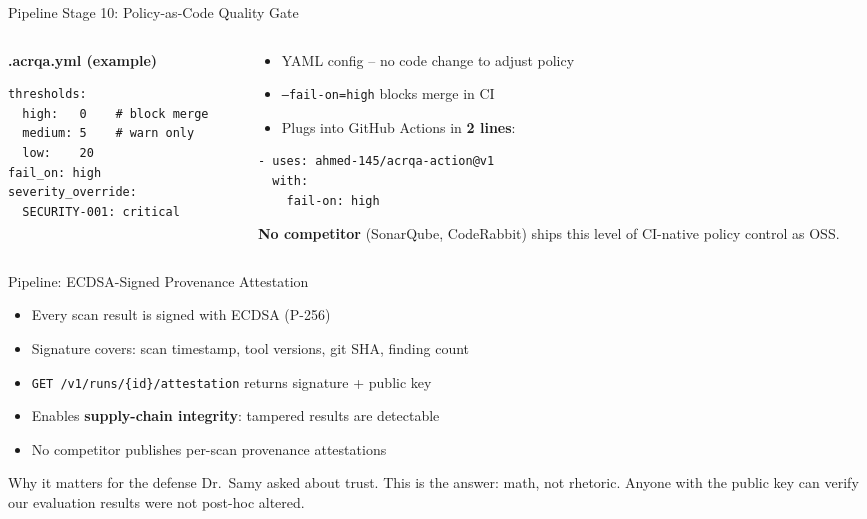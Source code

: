 \documentclass[aspectratio=169,12pt]{beamer}
\begin{document}
\begin{frame}[fragile]{Pipeline Stage 10: Policy-as-Code Quality Gate}
  \begin{columns}[T]
    \begin{column}{0.5\textwidth}
      \textbf{.acrqa.yml (example)}
      \vspace{4pt}
      \begin{lstlisting}
thresholds:
  high:   0    # block merge
  medium: 5    # warn only
  low:    20
fail_on: high
severity_override:
  SECURITY-001: critical
      \end{lstlisting}
    \end{column}
    \begin{column}{0.5\textwidth}
      \begin{itemize}
        \item YAML config -- no code change to adjust policy
        \item \texttt{--fail-on=high} blocks merge in CI
        \item Plugs into GitHub Actions in \textbf{2 lines}:
      \end{itemize}
      \begin{lstlisting}
- uses: ahmed-145/acrqa-action@v1
  with:
    fail-on: high
      \end{lstlisting}
      \vspace{4pt}
      \textbf{No competitor} (SonarQube, CodeRabbit) ships this level of CI-native policy control as OSS.
    \end{column}
  \end{columns}
\end{frame}

\begin{frame}{Pipeline: ECDSA-Signed Provenance Attestation}
  \begin{itemize}
    \item Every scan result is signed with ECDSA (P-256)
    \item Signature covers: scan timestamp, tool versions, git SHA, finding count
    \item \texttt{GET /v1/runs/\{id\}/attestation} returns signature + public key
    \item Enables \textbf{supply-chain integrity}: tampered results are detectable
    \item No competitor publishes per-scan provenance attestations
  \end{itemize}
  \vspace{8pt}
  \begin{exampleblock}{Why it matters for the defense}
    Dr.\ Samy asked about trust. This is the answer: math, not rhetoric.
    Anyone with the public key can verify our evaluation results were not
    post-hoc altered.
  \end{exampleblock}
\end{frame}
\end{document}
